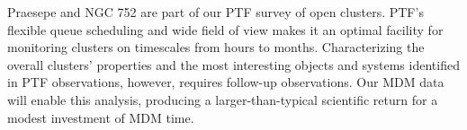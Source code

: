\whymdm
Praesepe and NGC 752 are part of our PTF survey of open clusters. PTF's flexible queue scheduling and wide field of view makes it an optimal facility for monitoring clusters on timescales from hours to months. Characterizing the overall clusters' properties and the most interesting objects and systems identified in PTF observations, however, requires follow-up observations. Our MDM data will enable this analysis, producing a larger-than-typical scientific return for a modest investment of MDM time.

%

\thepast
{} 



